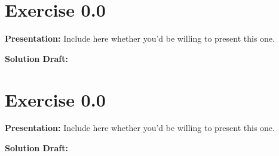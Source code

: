 \documentclass{article}
\begin{document}
\section*{Exercise 0.0}  

\noindent\textbf{Presentation:} Include here whether you'd be willing to present this one. 

\vspace{0.5cm} %


\noindent\textbf{Solution Draft:} 

\section*{Exercise 0.0}  

\noindent\textbf{Presentation:} Include here whether you'd be willing to present this one. 

\vspace{0.5cm} %


\noindent\textbf{Solution Draft:} 
\end{document}
